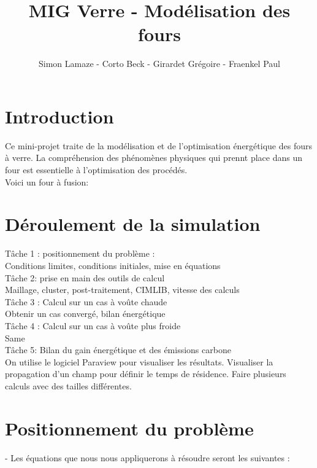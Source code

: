 \documentclass[12pt, a4paper, french, BCOR = 0pt, DIV = 10]{scrartcl}
\title{MIG Verre - Modélisation des fours}
\author{\small{Simon Lamaze - Corto Beck - Girardet Grégoire - Fraenkel Paul}}
\begin{document}
    
    \maketitle
    
    \section{Introduction}
    \raggedright
    Ce mini-projet traite de la modélisation et de l'optimisation énergétique des fours à verre.  La compréhension des phénomènes physiques qui prennt place dans un four est essentielle à l'optimisation des procédés. \\ [0.5 cm]
    Voici un four à fusion:
    

    
    
    
    
    \section{ Déroulement de la simulation}
    \raggedright
    Tâche 1 : positionnement du problème : \\
    Conditions limites, conditions initiales, mise en équations \\[0.3 cm]
    Tâche 2: prise en main des outils de calcul\\
    Maillage, cluster, post-traitement, CIMLIB, vitesse des calculs \\ [0.3 cm]
    
    Tâche 3 : Calcul sur un cas à voûte chaude\\ 
    Obtenir un cas convergé, bilan énergétique \\ [0.3 cm]
    
    Tâche 4 : Calcul sur un cas à voûte plus froide \\ 
    Same\\ [0.3 cm]
    
    Tâche 5: Bilan du gain énergétique et des émissions carbone \\ [0.5cm]
    
    
    On  utilise le logiciel Paraview pour visualiser les résultats.
    Visualiser la propagation d'un champ pour définir le temps de résidence.
    Faire plusieurs calculs avec des tailles différentes.
    
    \section{Positionnement du problème}
    - Les équations que nous nous appliquerons à résoudre seront les suivantes : \\
\end{document}
